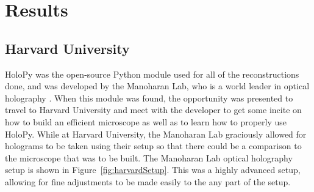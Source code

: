 %
%

\chapter{Results} \label{chap:Results}
\section{Harvard University}

HoloPy was the open-source Python module used for all of the reconstructions
done, and was developed by the Manoharan Lab, who is a world leader in optical
holography \cite{Manoharan}. When this module was found, the opportunity was presented to travel to
Harvard University and meet with the developer to get some incite on how to
build an efficient microscope as well as to learn how to properly use HoloPy. While at
Harvard University, the Manoharan Lab graciously allowed for holograms to be
taken using their setup so that there could be a comparison to the microscope
that was to be built. The Manoharan Lab optical holography setup is shown in
Figure~\ref{fig:harvardSetup}. This was a highly advanced setup, allowing for
fine adjustments to be made easily to the any part of the setup.

